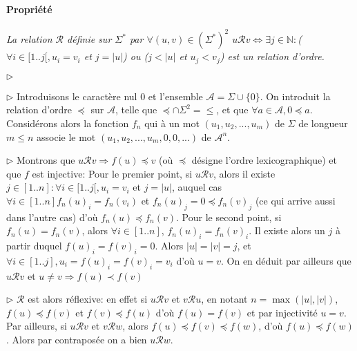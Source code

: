 \documentclass{scrartcl}
\begin{document}
			\paragraph{Propriété} \textsl{La relation $\mathcal{R}$ définie sur $\Sigma^*$ par $\forall (u,v)\in(\Sigma^*)^2$
			$u\mathcal{R}v \Leftrightarrow \exists j \in \mathbb{N}: $($\forall i \in [1..j[, u_i = v_i$ et $j=|u|$) ou 
			($j < |u|$ et $u_j < v_j$) est un relation d'ordre.}
			\begin{labeling}{$\triangleright$}
				\item [$\triangleright$] Introduisons le caractère nul 0 et l'ensemble $\mathcal{A} = \Sigma \cup \{0\}$.
					On introduit la relation d'ordre $\preceq$ sur $\mathcal{A}$, telle que $\preceq\cap\Sigma^2 = \leq$, et 
					que $\forall a \in \mathcal{A}, 0 \preceq a$.
					Considérons alors la fonction $f_n$ qui à un mot $(u_1,u_2,...,u_m)$ de $\Sigma$ de longueur $m \leq n$ associe
					le mot $(u_1,u_2,...,u_m,0,0,...)$ de $\mathcal{A}^n$.
				\item [$\triangleright$] Montrons que $u \mathcal{R}v \Rightarrow f(u) \preceq v$ (où $\preceq$ désigne l'ordre lexicographique) 
					et que $f$ est injective:
					Pour le premier point, si $u \mathcal{R} v$, alors il existe $j \in [1..n] : \forall i \in [1..j[, u_i = v_i$ et $j=|u|$,
					auquel cas $\forall i \in [1..n] f_n(u)_i = f_n(v_i)$ et $f_n(u)_j = 0 \preceq f_n(v)_j$ (ce qui arrive aussi dans l'autre cas)
					d'où $f_n(u) \preceq f_n(v)$.
					Pour le second point, si $f_n(u) = f_n(v)$, alors $\forall i \in [1..n]$, $f_n(u)_i = f_n(v)_i$.
					Il existe alors un $j$ à partir duquel $f(u)_i = f(v)_i = 0$. Alors $|u|=|v|=j$, 
					et $\forall i \in [1..j], u_i=f(u)_i = f(v)_i = v_i$ d'où $u=v$.
					On en déduit par ailleurs que $u\mathcal{R}v$ et $u\neq v \Rightarrow f(u) \prec f(v)$
				\item [$\triangleright$] $\mathcal{R}$ est alors réflexive: en effet si $u\mathcal{R}v$ et $v\mathcal{R}u$,
					en notant $n=\max(|u|,|v|)$, $f(u) \preceq f(v)$ et $f(v) \preceq f(u)$ d'où $f(u)=f(v)$ et par injectivité 
					$u=v$. Par ailleurs, si $u\mathcal{R}v$ et $v\mathcal{R}w$, alors $f(u) \preceq f(v) \preceq f(w)$, d'où 
					$f(u) \preceq f(w)$. Alors par contraposée on a bien $u\mathcal{R}w$. 
			\end{labeling}
\end{document}
